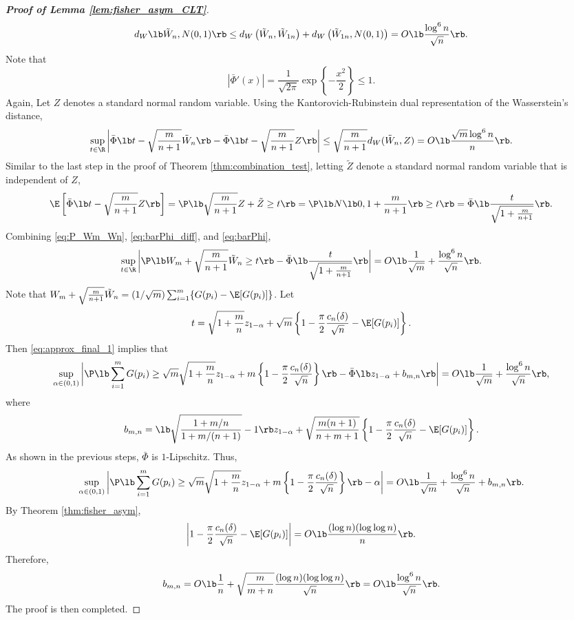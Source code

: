 \begin{proof}[\textbf{Proof of Lemma \ref{lem:fisher_asym_CLT}}]
\begin{equation}
  \label{eq:Wn_CLT}
  d_{W}\lb\tilde{W}_{n}, N(0, 1)\rb\le d_{W}\left(\tilde{W}_{n}, \tilde{W}_{1n}\right) + d_{W}\left(\tilde{W}_{1n}, N(0, 1)\right) = O\lb\frac{\log^6 n}{\sqrt{n}}\rb.
\end{equation}
Note that
\[|\bar{\Phi}'(x)| = \frac{1}{\sqrt{2\pi}}\exp\left\{-\frac{x^2}{2}\right\} \le 1.\]
Again, Let $Z$ denotes a standard normal random variable. Using the Kantorovich-Rubinstein dual representation of the Wasserstein's distance,
\begin{equation}
  \label{eq:barPhi_diff}
  \sup_{t\in \R}\bigg|\bar{\Phi}\lb t - \sqrt{\frac{m}{n+1}}\tilde{W}_n\rb - \bar{\Phi}\lb t - \sqrt{\frac{m}{n+1}}Z\rb\bigg| \le \sqrt{\frac{m}{n+1}} d_{W}(\tilde{W}_{n}, Z) = O\lb\frac{\sqrt{m}\log^6 n}{n}\rb.
\end{equation}
Similar to the last step in the proof of Theorem \ref{thm:combination_test}, letting $\tilde{Z}$ denote a standard normal random variable that is independent of $Z$,
\begin{equation}
  \label{eq:barPhi}
  \E\left[\bar{\Phi}\lb t - \sqrt{\frac{m}{n+1}}Z\rb\right] = \P\lb \sqrt{\frac{m}{n+1}}Z + \tilde{Z}\ge t\rb = \P\lb N\lb 0, 1 + \frac{m}{n+1}\rb\ge t\rb = \bar{\Phi}\lb \frac{t}{\sqrt{1 + \frac{m}{n+1}}}\rb.
\end{equation}
Combining \eqref{eq:P_Wm_Wn}, \eqref{eq:barPhi_diff}, and \eqref{eq:barPhi},
\begin{equation}\label{eq:approx_final_1}
  \sup_{t\in \R}\bigg|\P\lb W_{m} + \sqrt{\frac{m}{n+1}}\tilde{W}_{n}\ge t \rb - \bar{\Phi}\lb \frac{t}{\sqrt{1 + \frac{m}{n+1}}}\rb\bigg| = O\lb \frac{1}{\sqrt{m}} + \frac{\log^6 n}{\sqrt{n}}\rb.
\end{equation}
Note that $W_{m} + \sqrt{\frac{m}{n+1}}\tilde{W}_{n} = (1/\sqrt{m})\sum_{i=1}^{m}\{G(p_i) - \E[G(p_i)]\}$. Let
\[t = \sqrt{1 + \frac{m}{n}}z_{1 - \alpha} + \sqrt{m}\left\{ 1 - \frac{\pi}{2}\frac{c_n(\delta)}{\sqrt{n}} - \E[G(p_i)]\right\}.\]
Then \eqref{eq:approx_final_1} implies that
\[\sup_{\alpha\in (0, 1)}\bigg|\P\lb \sum_{i=1}^{m}G(p_i)\ge \sqrt{m}\sqrt{1 + \frac{m}{n}}z_{1- \alpha} + m \left\{ 1 - \frac{\pi}{2}\frac{c_n(\delta)}{\sqrt{n}}\right\}\rb - \bar{\Phi}\lb z_{1-\alpha} + b_{m, n}\rb\bigg| = O\lb \frac{1}{\sqrt{m}} + \frac{\log^6 n}{\sqrt{n}}\rb,\]
where
\[b_{m, n} = \lb\sqrt{\frac{1 + m/n}{1 + m / (n+1)}} - 1\rb z_{1-\alpha} + \sqrt{\frac{m(n + 1)}{n + m + 1}}\left\{ 1 - \frac{\pi}{2}\frac{c_n(\delta)}{\sqrt{n}} - \E[G(p_i)]\right\}.\]
As shown in the previous steps, $\bar{\Phi}$ is $1$-Lipschitz. Thus,
\[\sup_{\alpha\in (0, 1)}\bigg|\P\lb \sum_{i=1}^{m}G(p_i)\ge \sqrt{m}\sqrt{1 + \frac{m}{n}}z_{1- \alpha} + m \left\{ 1 - \frac{\pi}{2}\frac{c_n(\delta)}{\sqrt{n}}\right\}\rb - \alpha\bigg| = O\lb \frac{1}{\sqrt{m}} + \frac{\log^6 n}{\sqrt{n}} + b_{m, n}\rb.\]
By Theorem \ref{thm:fisher_asym},
\[\bigg|1 - \frac{\pi}{2}\frac{c_n(\delta)}{\sqrt{n}} - \E[G(p_i)]\bigg| = O\lb \frac{(\log n)(\log \log n)}{n}\rb.\]
Therefore,
\[b_{m, n} = O\lb \frac{1}{n} + \sqrt{\frac{m}{m+n}}\frac{(\log n)(\log \log n)}{\sqrt{n}}\rb = O\lb\frac{\log^6 n}{\sqrt{n}}\rb.\]
The proof is then completed.
\end{proof}
